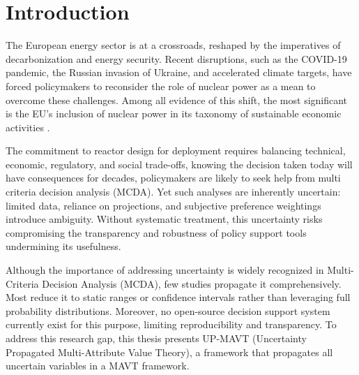 \documentclass[11pt,a4paper,twocolumn]{article}
\begin{document}



\section{Introduction}
\label{sec:introduction}
The European energy sector is at a crossroads, reshaped by the imperatives of decarbonization and energy security. Recent disruptions, such as the COVID-19 pandemic, the Russian invasion of Ukraine, and accelerated climate targets, have forced policymakers to reconsider the role of nuclear power as a mean to overcome these challenges. Among all evidence of this shift, the most significant is the EU’s inclusion of nuclear power in its taxonomy of sustainable economic activities \cite{EUTaxonomy}.

The commitment to reactor design for deployment requires balancing technical, economic, regulatory, and social trade-offs, knowing the decision taken today will have consequences for decades, policymakers are likely to seek help from multi criteria decision analysis (MCDA). Yet such analyses are inherently uncertain: limited data, reliance on projections, and subjective preference weightings introduce ambiguity. Without systematic treatment, this uncertainty risks compromising the transparency and robustness of policy support tools undermining its usefulness.

Although the importance of addressing uncertainty is widely recognized in Multi-Criteria Decision Analysis (MCDA), few studies propagate it comprehensively. Most reduce it to static ranges or confidence intervals rather than leveraging full probability distributions. Moreover, no open-source decision support system currently exist for this purpose, limiting reproducibility and transparency. To address this research gap, this thesis presents UP-MAVT (Uncertainty Propagated Multi-Attribute Value Theory), a framework that propagates all uncertain variables in a MAVT framework. 
\end{document}
